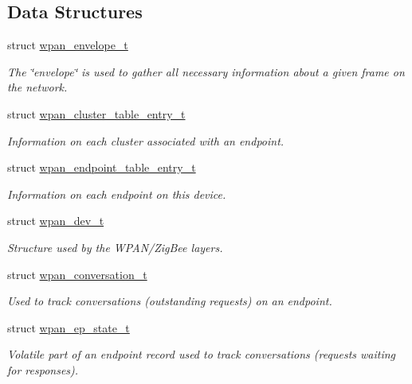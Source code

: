 \subsection*{Data Structures}
\begin{DoxyCompactItemize}
\item 
struct \hyperlink{structwpan__envelope__t}{wpan\-\_\-envelope\-\_\-t}
\begin{DoxyCompactList}\small\item\em The \char`\"{}envelope\char`\"{} is used to gather all necessary information about a given frame on the network. \end{DoxyCompactList}\item 
struct \hyperlink{structwpan__cluster__table__entry__t}{wpan\-\_\-cluster\-\_\-table\-\_\-entry\-\_\-t}
\begin{DoxyCompactList}\small\item\em Information on each cluster associated with an endpoint. \end{DoxyCompactList}\item 
struct \hyperlink{structwpan__endpoint__table__entry__t}{wpan\-\_\-endpoint\-\_\-table\-\_\-entry\-\_\-t}
\begin{DoxyCompactList}\small\item\em Information on each endpoint on this device. \end{DoxyCompactList}\item 
struct \hyperlink{structwpan__dev__t}{wpan\-\_\-dev\-\_\-t}
\begin{DoxyCompactList}\small\item\em Structure used by the W\-P\-A\-N/\-Zig\-Bee layers. \end{DoxyCompactList}\item 
struct \hyperlink{structwpan__conversation__t}{wpan\-\_\-conversation\-\_\-t}
\begin{DoxyCompactList}\small\item\em Used to track conversations (outstanding requests) on an endpoint. \end{DoxyCompactList}\item 
struct \hyperlink{structwpan__ep__state__t}{wpan\-\_\-ep\-\_\-state\-\_\-t}
\begin{DoxyCompactList}\small\item\em Volatile part of an endpoint record used to track conversations (requests waiting for responses). \end{DoxyCompactList}\end{DoxyCompactItemize}
